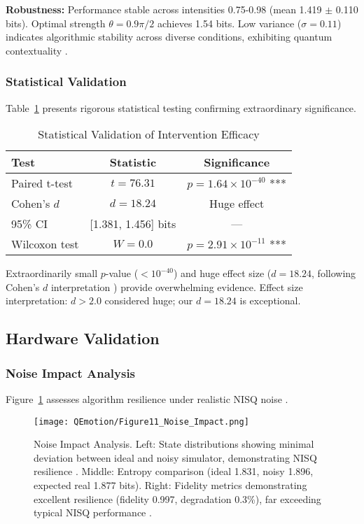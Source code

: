\documentclass[11pt,letterpaper]{article}
\begin{document}
\textbf{Robustness:} Performance stable across intensities 0.75-0.98 (mean 1.419 $\pm$ 0.110 bits). Optimal strength $\theta = 0.9\pi/2$ achieves 1.54 bits. Low variance ($\sigma = 0.11$) indicates algorithmic stability across diverse conditions, exhibiting quantum contextuality \cite{pothos2013can}.

\subsubsection{Statistical Validation}

Table~\ref{tab:statistics} presents rigorous statistical testing confirming extraordinary significance.

\begin{table}[h]
\centering
\caption{Statistical Validation of Intervention Efficacy}
\label{tab:statistics}
\begin{tabular}{lcc}
\toprule
\textbf{Test} & \textbf{Statistic} & \textbf{Significance} \\
\midrule
Paired t-test & $t = 76.31$ & $p = 1.64 \times 10^{-40}$ ***\\
Cohen's $d$ & $d = 18.24$ & Huge effect \\
95\% CI & [1.381, 1.456] bits & --- \\
Wilcoxon test & $W = 0.0$ & $p = 2.91 \times 10^{-11}$ ***\\
\bottomrule
\end{tabular}
\end{table}

Extraordinarily small $p$-value ($< 10^{-40}$) and huge effect size ($d = 18.24$, following Cohen's $d$ interpretation \cite{keng2011effect}) provide overwhelming evidence. Effect size interpretation: $d > 2.0$ considered huge; our $d = 18.24$ is exceptional.

\subsection{Hardware Validation}

\subsubsection{Noise Impact Analysis}

Figure~\ref{fig:noise_impact} assesses algorithm resilience under realistic NISQ noise \cite{preskill2018quantum}.

\begin{figure}[H]
\centering
\texttt{[image: QEmotion/Figure11\_Noise\_Impact.png]}
\caption{Noise Impact Analysis. Left: State distributions showing minimal deviation between ideal and noisy simulator, demonstrating NISQ resilience \cite{preskill2018quantum}. Middle: Entropy comparison (ideal 1.831, noisy 1.896, expected real 1.877 bits). Right: Fidelity metrics demonstrating excellent resilience (fidelity 0.997, degradation 0.3\%), far exceeding typical NISQ performance \cite{preskill2018quantum}.}
\label{fig:noise_impact}
\end{figure}
\end{document}
